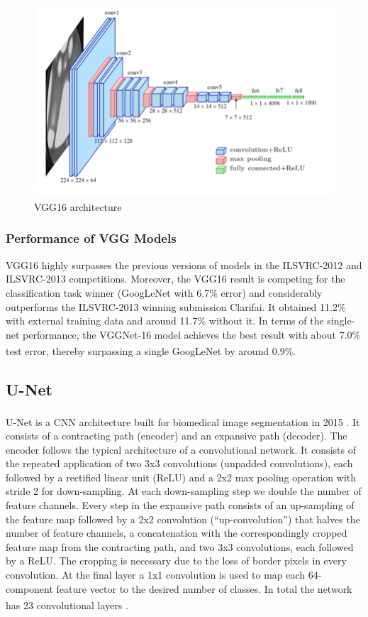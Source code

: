 \vspace{0.2in}

\begin{figure}[h]
\centering
    \centerline{\includegraphics[width = 4.5in]{../images/VGG16-architecture.png}}
    \caption{VGG16 architecture}
\end{figure}

\subsubsection{Performance of VGG Models}
\hspace{\parindent}
VGG16 highly surpasses the previous versions of models in the ILSVRC-2012 and ILSVRC-2013 competitions. Moreover, the VGG16 result is competing for the classification task winner (GoogLeNet with 6.7\% error) and considerably outperforms the ILSVRC-2013 winning submission Clarifai. It obtained 11.2\% with external training data and around 11.7\% without it. In terms of the single-net performance, the VGGNet-16 model achieves the best result with about 7.0\% test error, thereby surpassing a single GoogLeNet by around 0.9\%. \textsuperscript{\cite{VGG-Gaudenz_Boesch}}

\subsection{U-Net}
U-Net is a CNN architecture built for biomedical image segmentation in 2015 \textsuperscript{\cite{ronneberger2015u}}. It consists of a contracting path (encoder) and an expansive path (decoder). The encoder follows the typical architecture of a convolutional network. It consists of the repeated application of two 3x3 convolutions (unpadded convolutions), each followed by a rectified linear unit (ReLU) and a 2x2 max pooling operation with stride 2 for down-sampling. At each down-sampling step we double the number of feature channels. Every step in the expansive path consists of an up-sampling of the feature map followed by a 2x2 convolution (“up-convolution”) that halves the number of feature channels, a concatenation with the correspondingly cropped feature map from the contracting path, and two 3x3 convolutions, each followed by a ReLU. The cropping is necessary due to the loss of border pixels in every convolution. At the final layer a 1x1 convolution is used to map each 64-component feature vector to the desired number of classes. In total the network has 23 convolutional layers \textsuperscript{\cite{paperswithcode-U-Net}}.


